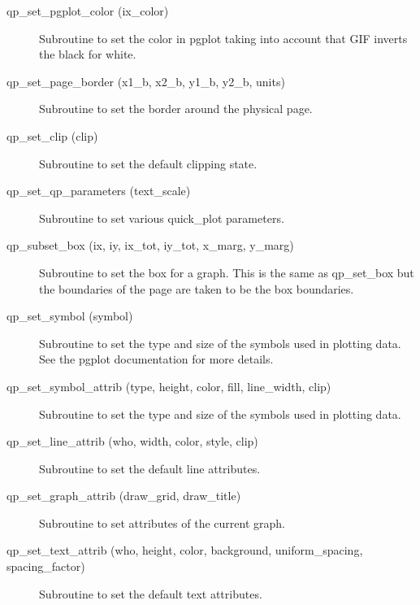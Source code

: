 \begin{description}
\item[qp\_set\_pgplot\_color (ix\_color) ] \Newline 
     Subroutine to set the color in pgplot taking into account that GIF
     inverts the black for white.

\item[qp\_set\_page\_border (x1\_b, x2\_b, y1\_b, y2\_b, units)] \Newline 
     Subroutine to set the border around the physical page.

\item[qp\_set\_clip (clip)] \Newline 
     Subroutine to set the default clipping state.

\item[qp\_set\_qp\_parameters (text\_scale)] \Newline 
Subroutine to set various quick\_plot parameters.

\item[qp\_subset\_box (ix, iy, ix\_tot, iy\_tot, x\_marg, y\_marg)] \Newline 
     Subroutine to set the box for a graph. This is the same as
     qp\_set\_box but the boundaries of the page are taken to be the box boundaries.

\item[qp\_set\_symbol (symbol)] \Newline 
     Subroutine to set the type and size of the symbols used in plotting data.
     See the pgplot documentation for more details.

\item[qp\_set\_symbol\_attrib (type, height, color, fill, line\_width, clip)] \Newline 
     Subroutine to set the type and size of the symbols used in plotting data.

\item[qp\_set\_line\_attrib (who, width, color, style, clip)] \Newline 
     Subroutine to set the default line attributes.

\item[qp\_set\_graph\_attrib (draw\_grid, draw\_title)] \Newline 
     Subroutine to set attributes of the current graph.

\item[qp\_set\_text\_attrib (who, height, color, background, 
                                uniform\_spacing, spacing\_factor) ] \Newline 
     Subroutine to set the default text attributes.

\end{description}


